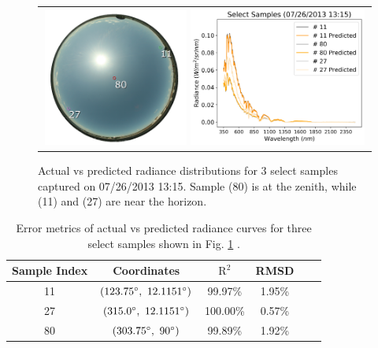 \begin{figure} [hbtp]
\begin{center}
\begin{tabular}{c}
\includegraphics[width=0.44\textwidth]{img/results_072613_sky.png}
\includegraphics[width=0.54\textwidth]{img/results_072613_samples.png}
\end{tabular}
\end{center}
\caption[selectcurveratios] { \label{fig:selectcurveratios}Actual vs predicted radiance distributions for 3 select samples captured on 07/26/2013 13:15. Sample (80) is at the zenith, while (11) and (27) are near the horizon.}
\end{figure}

\begin{table}[hbtp]
\caption{Error metrics of actual vs predicted radiance curves for three select samples shown in Fig. \ref{fig:selectcurveratios} .}
\label{tab:selectcurveerrors}
\centering
\begin{tabular}{*{6}{c}}
    \\
    \toprule
    Sample Index & Coordinates & $\mathrm{R}^2$ & RMSD \\
    \midrule
    11 & $(123.75\degree,~12.1151\degree)$ & 99.97\% & 1.95\% \\
    27 & $(315.0\degree,~12.1151\degree)$ & 100.00\% & 0.57\% \\
    80 & $(303.75\degree,~90\degree)$ & 99.89\% & 1.92\% \\
    \bottomrule
\end{tabular}
\end{table}

